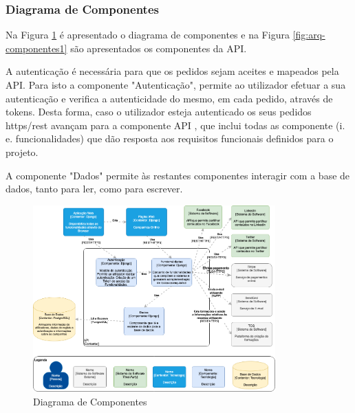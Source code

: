 \subsubsection{Diagrama de Componentes}

Na Figura \ref{fig:arq-componentes} é apresentado o diagrama de componentes e na Figura \ref{fig:arq-componentes1} são apresentados os componentes da API. 

A autenticação é necessária para que os pedidos sejam aceites e mapeados pela API. Para isto a componente "Autenticação", permite ao utilizador efetuar a sua autenticação e verifica a autenticidade do mesmo, em cada pedido, através de tokens. Desta forma, caso o utilizador esteja autenticado os seus pedidos \acrshort{https}/\acrshort{rest} avançam para a componente API , que inclui todas as componente (i. e. funcionalidades) que dão resposta aos requisitos funcionais definidos para o projeto.

A componente "Dados" permite às restantes componentes interagir com a base de dados, tanto para ler, como para escrever.

\newpage

\begin{figure}[ht!]
	\begin{center}
		\includegraphics[width=0.83\textwidth]{img/arq/diagrama-componentes}
		\caption{Diagrama de Componentes}
		\label{fig:arq-componentes}
	\end{center}
\end{figure}

